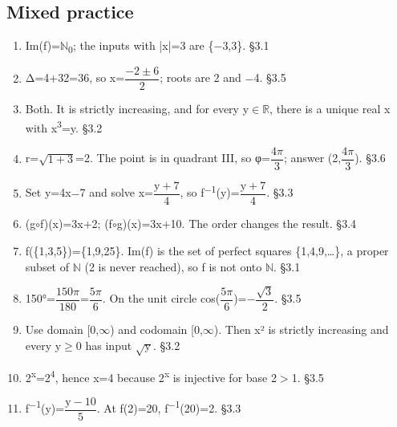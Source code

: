 \documentclass[11pt]{article}
\begin{document}
\begin{keepsection}\subsection{Mixed practice}

\begin{enumerate}
\item Im(f)=\ensuremath{\mathbb{N}}\textsubscript{0}; the inputs with |x|=3 are \{\ensuremath{-}3,3\}. \hfill{\small\color{FAUblue}§3.1}
\item Δ=4+32=36, so x={\small\ensuremath{\dfrac{-2\pm 6}{2}}}; roots are 2 and \ensuremath{-}4. \hfill{\small\color{FAUblue}§3.5}
\item Both. It is strictly increasing, and for every y\ensuremath{\in}\ensuremath{\mathbb{R}}, there is a unique real x with x\textsuperscript{3}=y. \hfill{\small\color{FAUblue}§3.2}
\item r=\ensuremath{\sqrt{1+3}}=2. The point is in quadrant III, so φ={\small\ensuremath{\dfrac{4π}{3}}}; answer (2,{\small\ensuremath{\dfrac{4π}{3}}}). \hfill{\small\color{FAUblue}§3.6}
\item Set y=4x\ensuremath{-}7 and solve x={\small\ensuremath{\dfrac{\mathrm{y}+7}{4}}}, so f\textsuperscript{\ensuremath{-}1}(y)={\small\ensuremath{\dfrac{\mathrm{y}+7}{4}}}. \hfill{\small\color{FAUblue}§3.3}
\item (g\ensuremath{\circ}f)(x)=3x+2; (f\ensuremath{\circ}g)(x)=3x+10. The order changes the result. \hfill{\small\color{FAUblue}§3.4}
\item f(\{1,3,5\})=\{1,9,25\}. Im(f) is the set of perfect squares \{1,4,9,…\}, a proper subset of \ensuremath{\mathbb{N}} (2 is never reached), so f is not onto \ensuremath{\mathbb{N}}. \hfill{\small\color{FAUblue}§3.1}
\item 150°={\small\ensuremath{\dfrac{150π}{180}}}={\small\ensuremath{\dfrac{5π}{6}}}. On the unit circle cos({\small\ensuremath{\dfrac{5π}{6}}})=\ensuremath{-}{\small\ensuremath{\dfrac{\sqrt{3}}{2}}}. \hfill{\small\color{FAUblue}§3.5}
\item Use domain [0,\ensuremath{\infty}) and codomain [0,\ensuremath{\infty}). Then x² is strictly increasing and every y\ensuremath{\geq}0 has input \ensuremath{\sqrt{\mathrm{y}}}. \hfill{\small\color{FAUblue}§3.2}
\item 2\textsuperscript{x}=2\textsuperscript{4}, hence x=4 because 2\textsuperscript{x} is injective for base 2\ensuremath{>}1. \hfill{\small\color{FAUblue}§3.5}
\item f\textsuperscript{\ensuremath{-}1}(y)={\small\ensuremath{\dfrac{\mathrm{y}-10}{5}}}. At f(2)=20, f\textsuperscript{\ensuremath{-}1}(20)=2. \hfill{\small\color{FAUblue}§3.3}

\end{enumerate}
\end{keepsection}
\end{document}

